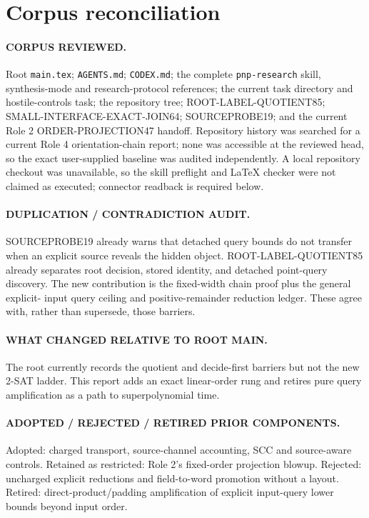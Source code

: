 \documentclass[11pt]{article}
\begin{document}
\section*{Corpus reconciliation}
\paragraph{CORPUS REVIEWED.}
Root \texttt{main.tex}; \texttt{AGENTS.md}; \texttt{CODEX.md}; the complete
\texttt{pnp-research} skill, synthesis-mode and research-protocol references;
the current task directory and hostile-controls task; the repository tree;
ROOT-LABEL-QUOTIENT85; SMALL-INTERFACE-EXACT-JOIN64; SOURCEPROBE19; and the
current Role 2 ORDER-PROJECTION47 handoff.  Repository history was searched for
a current Role 4 orientation-chain report; none was accessible at the reviewed
head, so the exact user-supplied baseline was audited independently.  A local
repository checkout was unavailable, so the skill preflight and LaTeX checker
were not claimed as executed; connector readback is required below.

\paragraph{DUPLICATION / CONTRADICTION AUDIT.}
SOURCEPROBE19 already warns that detached query bounds do not transfer when an
explicit source reveals the hidden object.  ROOT-LABEL-QUOTIENT85 already
separates root decision, stored identity, and detached point-query discovery.
The new contribution is the fixed-width chain proof plus the general explicit-
input query ceiling and positive-remainder reduction ledger.  These agree with,
rather than supersede, those barriers.

\paragraph{WHAT CHANGED RELATIVE TO ROOT MAIN.}
The root currently records the quotient and decide-first barriers but not the
new 2-SAT ladder.  This report adds an exact linear-order rung and retires pure
query amplification as a path to superpolynomial time.

\paragraph{ADOPTED / REJECTED / RETIRED PRIOR COMPONENTS.}
Adopted: charged transport, source-channel accounting, SCC and source-aware
controls.  Retained as restricted: Role 2's fixed-order projection blowup.
Rejected: uncharged explicit reductions and field-to-word promotion without a
layout.  Retired: direct-product/padding amplification of explicit input-query
lower bounds beyond input order.
\end{document}
